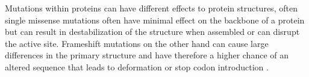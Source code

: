 Mutations within proteins can have different effects to protein structures, often single missense mutations often have minimal effect on the backbone of a protein \cite{feyfant_modeling_2007,chothia_relation_1986} but can result in destabilization of the structure when assembled or can disrupt the active site. Frameshift mutations on the other hand can cause large differences in the primary structure and have therefore a higher chance of an altered sequence that leads to deformation or stop codon introduction \cite{ogura_frameshift_2001}.
\label{subsec:GD_Structural_Levels_and_Mutation_Effects}


